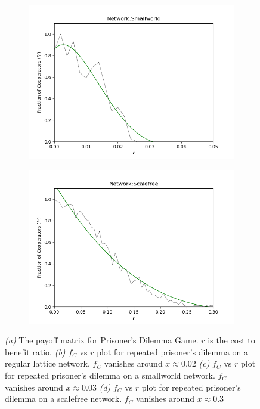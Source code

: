 \documentclass[11pt, A4 paper, twocolumn ]{article}
\begin{document}
\begin{figure}[h]
\begin{subfigure}[b]{0.23\textwidth}
			\includegraphics[width=\textwidth]{graphs/sw-imitate}
			\caption{}
			\label{fig:sw-imitate}
		\end{subfigure}
		\begin{subfigure}[b]{0.23\textwidth}
			\centering
			\includegraphics[width=\textwidth]{graphs/sf-imitate}
			\caption{}
			\label{fig:sf-imitate}
		\end{subfigure}
		\caption{\footnotesize \textit{(a)} The payoff matrix for Prisoner's Dilemma Game. $ r $ is the cost to benefit ratio.
		\textit{(b)} $ f_{C} $ vs $ r $ plot for repeated prisoner's dilemma on a regular lattice network. $ f_{C} $ vanishes around $ x \approx 0.02 $
	\textit{(c)} $ f_{C} $ vs $ r $ plot for repeated prisoner's dilemma on a smallworld network. $ f_{C} $ vanishes around $ x \approx 0.03 $
\textit{(d)} $ f_{C} $ vs $ r $ plot for repeated prisoner's dilemma on a scalefree network. $ f_{C} $ vanishes around $ x \approx 0.3 $ }
		\label{fig:imitate}
	\end{figure}
		
\end{document}
